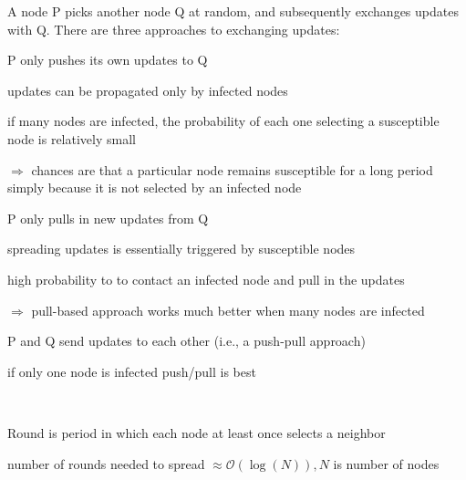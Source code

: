 \documentclass[ngerman,a4paper]{report}
\begin{document}
A node P picks another node Q at random, and subsequently exchanges updates with Q.
There are three approaches to exchanging updates:
\begin{compactenum}

	\item P only pushes its own updates to Q
	\begin{compactitem}
		\item updates can be propagated only by infected nodes
		\item if many nodes are infected, the probability of each one selecting a susceptible node is relatively small
		\item $\Rightarrow$ chances are that a particular node remains susceptible for a long period simply because it is not selected by an infected node
	\end{compactitem}

	\item P only pulls in new updates from Q
	\begin{compactitem}		
		\item spreading updates is essentially triggered by susceptible nodes
		\item high probability to to contact an infected node and pull in the updates
		\item $\Rightarrow$ pull-based approach works much better when many nodes are infected
	\end{compactitem}

	\item P and Q send updates to each other (i.e., a push-pull approach)
	\begin{compactitem}
		\item if only one node is infected push/pull is best
	\end{compactitem}
\end{compactenum}

\

\begin{compactitem}
	\item Round is period in which each node at least once selects a neighbor
	\item number of rounds needed to spread  $\approx \mathcal{O}(\log(N)), N$ is number of nodes
\end{compactitem}
\end{document}
